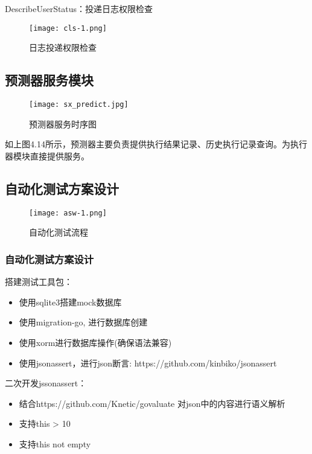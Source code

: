 DescribeUserStatus：投递日志权限检查

\begin{figure}[H]
    \centering
    \texttt{[image: cls-1.png]}
    \caption{日志投递权限检查}
    \label{fig:rztdqx}
\end{figure}


\subsection{预测器服务模块}

\begin{figure}[H]
    \centering
    \texttt{[image: sx\_predict.jpg]}
    \caption{预测器服务时序图}
    \label{fig:预测器服务时序图}
\end{figure}

如上图4.14所示，预测器主要负责提供执行结果记录、历史执行记录查询。为执行器模块直接提供服务。\cite{le2021deep}



\subsection{自动化测试方案设计}

\begin{figure}[H]
    \centering
    \texttt{[image: asw-1.png]}
    \caption{自动化测试流程}
    \label{fig:自动化测试流程}
\end{figure}



\subsubsection{自动化测试方案设计}

搭建测试工具包：
\begin{itemize}
    \item 使用sqlite3搭建mock数据库
    \item 使用migration-go, 进行数据库创建
    \item 使用xorm进行数据库操作(确保语法兼容)
    \item 使用jsonassert，进行json断言: https://github.com/kinbiko/jsonassert
\end{itemize}


二次开发jssonassert：
\begin{itemize}
    \item 结合https://github.com/Knetic/govaluate 对json中的内容进行语义解析
    \item 支持this > 10
    \item 支持this not empty
\end{itemize}


